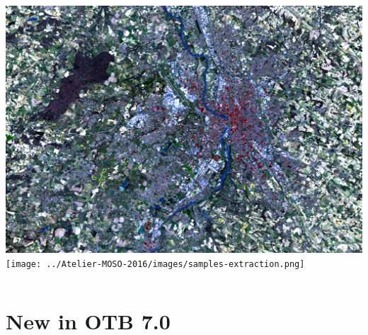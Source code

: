 \documentclass[8pt,aspectratio=169]{beamer}
\begin{document}
\begin{frame}
\begin{columns}
        \includegraphics[trim={0 5cm 0 5cm},width=\textwidth]{../../Courses/org/WorkshopGuide/Images/samples_selection.png}\\
          \texttt{[image: ../Atelier-MOSO-2016/images/samples-extraction.png]}
        \end{columns}        
    \end{frame}
  
\section{New in OTB 7.0}
\end{document}
